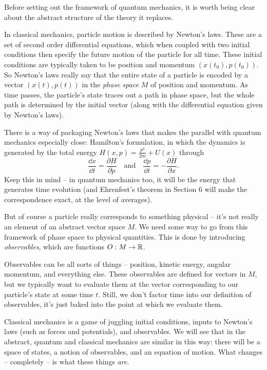 \documentclass[a4paper]{scrartcl}
\begin{document}
Before setting out the framework of quantum mechanics, it is worth being clear about the abstract structure of the theory it replaces.

In classical mechanics, particle motion is described by Newton's laws. These are a set of second order differential equations, which when coupled with two initial conditions then specify the future motion of the particle for all time. These initial conditions are typically taken to be position and momentum $(x(t_0), p(t_0))$. So Newton's laws really say that the entire state of a particle is encoded by a vector $(x(t), p(t))$ in the \emph{phase space} $M$ of position and momentum. As time passes, the particle's state traces out a path in phase space, but the whole path is determined by the initial vector (along with the differential equation given by Newton's laws).

There is a way of packaging Newton's laws that makes the parallel with quantum mechanics especially close: Hamilton's formulation, in which the dynamics is generated by the total energy $H(x, p) = \frac{p^2}{2m} + U(x)$ through
$$
\frac{\dd x}{\dd t} = \frac{\partial H}{\partial p} \quad \text{and} \quad \frac{\dd p}{\dd t} = -\frac{\partial H}{\partial x}.
$$
Keep this in mind -- in quantum mechanics too, it will be the energy that generates time evolution (and Ehrenfest's theorem in Section 6 will make the correspondence exact, at the level of averages).

But of course a particle really corresponds to something physical -- it's not really an element of an abstract vector space $M$. We need some way to go from this framework of phase space to physical quantities. This is done by introducing \emph{observables}, which are functions $O: M \rightarrow \mathbb{R}$.

Observables can be all sorts of things -- position, kinetic energy, angular momentum, and everything else. These observables are defined for vectors in $M$, but we typically want to evaluate them at the vector corresponding to our particle's state at some time $t$. Still, we don't factor time into our definition of observables, it's just baked into the point at which we evaluate them.

Classical mechanics is a game of juggling initial conditions, inputs to Newton's laws (such as forces and potentials), and observables. We will see that in the abstract, quantum and classical mechanics are similar in this way: there will be a space of states, a notion of observables, and an equation of motion. What changes -- completely -- is what these things \emph{are}.
\end{document}

